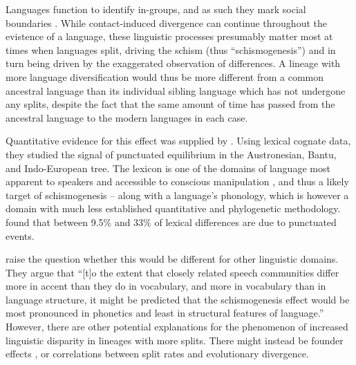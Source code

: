 \documentclass[]{rsos}%
\begin{document}
Languages function to identify in-groups, and as such they mark social
boundaries \parencite{labov1963social,epps2020amazonian}.
While contact-induced divergence \textcite{evans2019linguistic} can continue
throughout the evistence of a language, these linguistic processes presumably
matter most at times when languages split, driving the schism (thus
“schismogenesis”) and in turn being driven by the exaggerated observation of
differences. A lineage with more language diversification would thus be more
different from a common ancestral language than its individual sibling language
which has not undergone any splits, despite the fact that the same amount of
time has passed from the ancestral language to the modern languages in each
case.

Quantitative evidence for this effect was supplied by
\textcite{atkinson2008languages}. Using lexical cognate data, they studied the
signal of punctuated equilibrium \parencite{eldredge1972punctuated} in the
Austronesian, Bantu, and Indo-European tree. The lexicon is one of the domains
of language most apparent to speakers and accessible to conscious manipulation
\parencite[see][for an extensive discussion]{thomason2007language}, and thus a
likely target of schismogenesis – along with a language's phonology, which is
however a domain with much less established quantitative and phylogenetic
methodology.  found that between 9.5\% and
33\% of lexical differences are due to punctuated events.


\Textcite{gray2013three} raise the question whether this would be different for
other linguistic domains. They argue that “[t]o the extent that closely related
speech communities differ more in accent than they do in vocabulary, and more in
vocabulary than in language structure, it might be predicted that the
schismogenesis effect would be most pronounced in phonetics and least in
structural features of language.” \parencite[p. 295]{gray2013three} However,
there are other potential explanations for the phenomenon of increased
linguistic disparity in lineages with more splits. There might instead be
founder effects \parencite{atkinson2008languages,greenhill2017evolutionary},
or correlations between split rates and evolutionary divergence.
\end{document}
